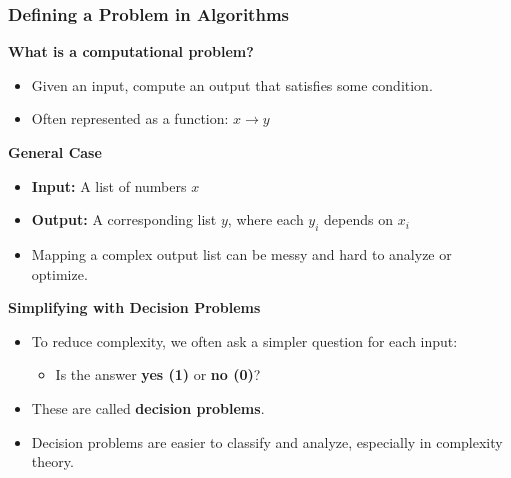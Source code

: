 \begin{frame}
  \frametitle{Defining a Problem in Algorithms}

  \textbf{What is a computational problem?}
  \begin{itemize}
      \item Given an input, compute an output that satisfies some condition.
      \item Often represented as a function: $x \rightarrow y$
  \end{itemize}

  \vspace{0.3cm}

  \textbf{General Case}
  \begin{itemize}
      \item \textbf{Input:} A list of numbers $x$
      \item \textbf{Output:} A corresponding list $y$, where each $y_i$ depends on $x_i$
      \item Mapping a complex output list can be messy and hard to analyze or optimize.
  \end{itemize}

  \vspace{0.3cm}

  \textbf{Simplifying with Decision Problems}
  \begin{itemize}
      \item To reduce complexity, we often ask a simpler question for each input:
            \begin{itemize}
                \item Is the answer \textbf{yes (1)} or \textbf{no (0)}?
            \end{itemize}
      \item These are called \textbf{decision problems}.
      \item Decision problems are easier to classify and analyze, especially in complexity theory.
  \end{itemize}
\end{frame}

